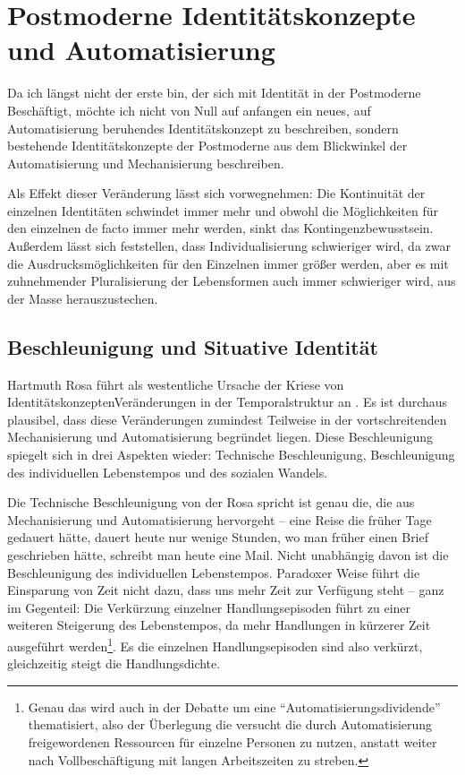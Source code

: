 \section{Postmoderne Identitätskonzepte und Automatisierung}

Da ich längst nicht der erste bin, der sich mit Identität in der Postmoderne Beschäftigt, möchte ich nicht von Null auf anfangen ein neues, auf Automatisierung beruhendes Identitätskonzept zu beschreiben, sondern bestehende Identitätskonzepte der Postmoderne aus dem Blickwinkel der Automatisierung und Mechanisierung beschreiben.

Als Effekt dieser Veränderung lässt sich vorwegnehmen: Die Kontinuität der einzelnen Identitäten schwindet immer mehr und obwohl die Möglichkeiten für den einzelnen de facto immer mehr werden, sinkt das Kontingenzbewusstsein.
Außerdem lässt sich feststellen, dass Individualisierung schwieriger wird, da zwar die Ausdrucksmöglichkeiten für den Einzelnen immer größer werden, aber es mit zuhnehmender Pluralisierung der Lebensformen auch immer schwieriger wird, aus der Masse herauszustechen.


\subsection{Beschleunigung und Situative Identität}

Hartmuth Rosa führt als westentliche Ursache der Kriese von IdentitätskonzeptenVeränderungen in der Temporalstruktur an \parencite{rosa}.
Es ist durchaus plausibel, dass diese Veränderungen zumindest Teilweise in der vortschreitenden Mechanisierung und Automatisierung begründet liegen.
Diese Beschleunigung spiegelt sich in drei Aspekten wieder: Technische Beschleunigung, Beschleunigung des individuellen Lebenstempos und des sozialen Wandels.

Die Technische Beschleunigung von der Rosa spricht ist genau die, die aus Mechanisierung und Automatisierung hervorgeht – eine Reise die früher Tage gedauert hätte, dauert heute nur wenige Stunden, wo man früher einen Brief geschrieben hätte, schreibt man heute eine Mail.
Nicht unabhängig davon ist die Beschleunigung des individuellen Lebenstempos.
Paradoxer Weise führt die Einsparung von Zeit nicht dazu, dass uns mehr Zeit zur Verfügung steht – ganz im Gegenteil: Die Verkürzung einzelner Handlungsepisoden führt zu einer weiteren Steigerung des Lebenstempos, da mehr Handlungen in kürzerer Zeit ausgeführt werden\footnote{Genau das wird auch in der Debatte um eine \enquote{Automatisierungsdividende} thematisiert, also der Überlegung die versucht die durch Automatisierung freigewordenen Ressourcen für einzelne Personen zu nutzen, anstatt weiter nach Vollbeschäftigung mit langen Arbeitszeiten zu streben\parencite{faz}.}.
Es die einzelnen Handlungsepisoden sind also verkürzt, gleichzeitig steigt die Handlungsdichte.

